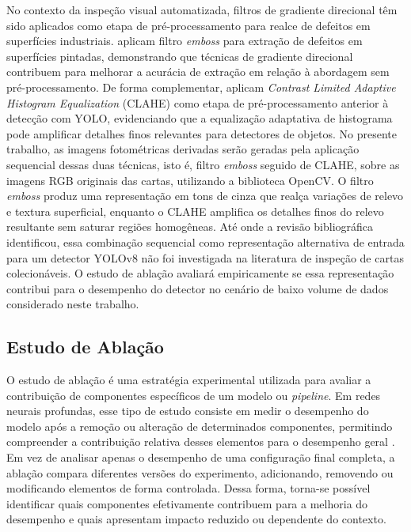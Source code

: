 \documentclass[
    12pt,                %
    openright,           %
    oneside,             %
    a4paper,             %
    english,             %
    brazil               %
]{abntex2}
\begin{document}
No contexto da inspeção visual automatizada, filtros de gradiente
direcional têm sido aplicados como etapa de pré-processamento para
realce de defeitos em superfícies industriais. 
aplicam filtro \textit{emboss} para extração de defeitos em
superfícies pintadas, demonstrando que técnicas de gradiente
direcional contribuem para melhorar a acurácia de extração em
relação à abordagem sem pré-processamento. De forma complementar,
 aplicam \textit{Contrast Limited Adaptive
Histogram Equalization} (CLAHE) como etapa de pré-processamento
anterior à detecção com YOLO, evidenciando que a equalização
adaptativa de histograma pode amplificar detalhes finos relevantes
para detectores de objetos. No presente trabalho, as imagens
fotométricas derivadas serão geradas pela aplicação sequencial
dessas duas técnicas, isto é, filtro \textit{emboss} seguido de CLAHE,
sobre as imagens RGB originais das cartas, utilizando a biblioteca
OpenCV. O filtro \textit{emboss} produz uma representação em tons de
cinza que realça variações de relevo e textura superficial, enquanto
o CLAHE amplifica os detalhes finos do relevo resultante sem saturar
regiões homogêneas. Até onde a revisão bibliográfica identificou,
essa combinação sequencial como representação alternativa de entrada
para um detector YOLOv8 não foi investigada na literatura de inspeção
de cartas colecionáveis. O estudo de ablação avaliará empiricamente
se essa representação contribui para o desempenho do detector no
cenário de baixo volume de dados considerado neste trabalho.



\subsection{Estudo de Ablação}
\label{subsec:ablacao}

O estudo de ablação é uma estratégia experimental utilizada para
avaliar a contribuição de componentes específicos de um modelo
ou \textit{pipeline}. Em redes neurais profundas, esse tipo de estudo
consiste em medir o desempenho do modelo após a remoção ou alteração
de determinados componentes, permitindo compreender a contribuição
relativa desses elementos para o desempenho geral \cite{Sheikholeslami2021}.
Em vez de analisar apenas o desempenho de uma configuração final completa,
a ablação compara diferentes versões do experimento, adicionando, removendo
ou modificando elementos de forma controlada. Dessa forma, torna-se possível
identificar quais componentes efetivamente contribuem para a melhoria do
desempenho e quais apresentam impacto reduzido ou dependente do contexto.
\end{document}
